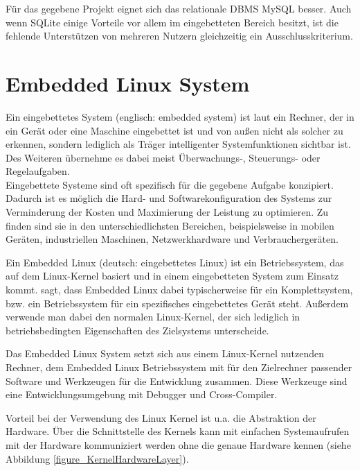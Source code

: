 Für das gegebene Projekt eignet sich das relationale \ac{DBMS} MySQL besser. Auch wenn SQLite einige Vorteile vor allem im eingebetteten Bereich besitzt, ist die fehlende Unterstützen von mehreren Nutzern gleichzeitig ein Ausschlusskriterium.

\newpage

\section{Embedded Linux System}
\label{section_EmbeddedLinux}

Ein eingebettetes System (englisch: embedded system) ist laut \cite{bender2005embedded} ein Rechner, der in ein Gerät oder eine Maschine eingebettet ist und von außen nicht als solcher zu erkennen, sondern lediglich als Träger intelligenter Systemfunktionen sichtbar ist. Des Weiteren übernehme es dabei meist Überwachungs-, Steuerungs- oder Regelaufgaben.\\
Eingebettete Systeme sind oft spezifisch für die gegebene Aufgabe konzipiert. Dadurch ist es möglich die Hard- und Softwarekonfiguration des Systems zur Verminderung der Kosten und Maximierung der Leistung zu optimieren. Zu finden sind sie in den unterschiedlichsten Bereichen, beispielsweise in mobilen Geräten, industriellen Maschinen, Netzwerkhardware und Verbrauchergeräten.\ 

Ein Embedded Linux (deutsch: eingebettetes Linux) ist ein Betriebssystem, das auf dem Linux-Kernel basiert und in einem eingebetteten System zum Einsatz kommt. \cite{yaghmour2008building} sagt, dass Embedded Linux dabei typischerweise für ein Komplettsystem, bzw. ein Betriebssystem für ein spezifisches eingebettetes Gerät steht. Außerdem verwende man dabei den normalen Linux-Kernel, der sich lediglich in betriebsbedingten Eigenschaften des Zielsystems unterscheide.\ 

Das Embedded Linux System setzt sich aus einem Linux-Kernel nutzenden Rechner, dem Embedded Linux Betriebssystem mit für den Zielrechner passender Software und Werkzeugen für die Entwicklung zusammen. Diese Werkzeuge sind eine Entwicklungsumgebung mit Debugger und Cross-Compiler.

Vorteil bei der Verwendung des Linux Kernel ist u.a. die Abstraktion der Hardware. Über die Schnittstelle des Kernels kann mit einfachen Systemaufrufen mit der Hardware kommuniziert werden ohne die genaue Hardware kennen (siehe Abbildung \ref{figure_KernelHardwareLayer}).\\

